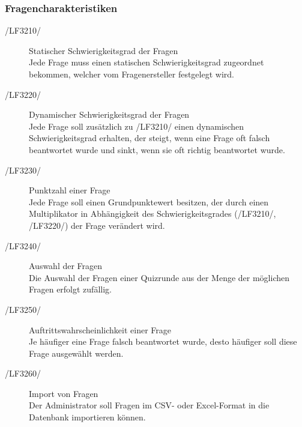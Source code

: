 \documentclass[11pt,a4paper]{scrreprt}
\begin{document}
\subsubsection{Fragencharakteristiken}
\begin{description}
\item[/LF3210/] Statischer Schwierigkeitsgrad der Fragen \\
Jede Frage muss einen statischen Schwierigkeitsgrad zugeordnet bekommen, welcher vom Fragenersteller festgelegt wird.

\item[/LF3220/] Dynamischer Schwierigkeitsgrad der Fragen \\
Jede Frage soll zusätzlich zu /LF3210/ einen dynamischen Schwierigkeitsgrad erhalten, der steigt, wenn eine Frage oft falsch beantwortet wurde und sinkt, wenn sie oft richtig beantwortet wurde.

\item[/LF3230/] Punktzahl einer Frage \\
Jede Frage soll einen Grundpunktewert besitzen, der durch einen Multiplikator in Abhängigkeit des Schwierigkeitsgrades (/LF3210/, /LF3220/) der Frage verändert wird.

\item[/LF3240/] Auswahl der Fragen \\
Die Auswahl der Fragen einer Quizrunde aus der Menge der möglichen Fragen erfolgt zufällig.

\item[/LF3250/] Auftrittswahrscheinlichkeit einer Frage \\
Je häufiger eine Frage falsch beantwortet wurde, desto häufiger soll diese Frage ausgewählt werden.

\item[/LF3260/] Import von Fragen \\
Der Administrator soll Fragen im CSV- oder Excel-Format in die Datenbank importieren können.
\end{description}
\end{document}
